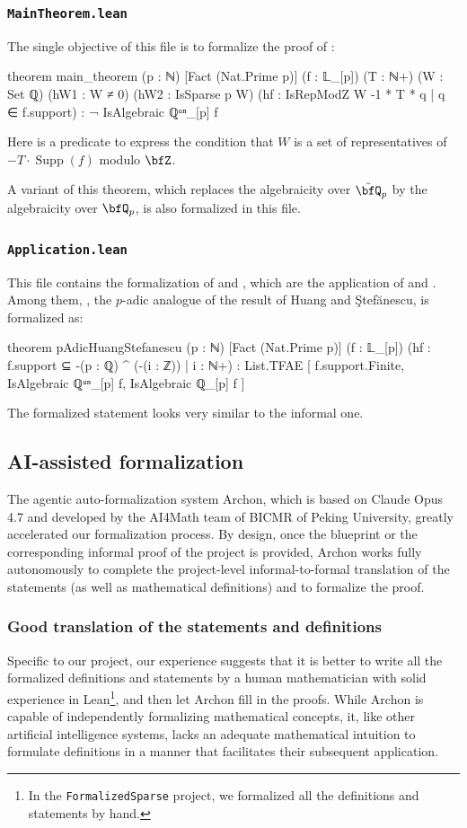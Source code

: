 \documentclass[english,oneside]{smfart}
\newcommand{\opn}[1]{\operatorname{#1}}
\begin{document}
\subsubsection{\texttt{MainTheorem.lean}}
The single objective of this file is to formalize the proof of :
\begin{leancode}
theorem main_theorem (p : ℕ) [Fact (Nat.Prime p)] (f : 𝕃_[p]) (T : ℕ+)
(W : Set ℚ) (hW1 : W ≠ {0}) (hW2 : IsSparse p W)
(hf : IsRepModZ W {-1 * T * q | q ∈ f.support}) :
  ¬ IsAlgebraic ℚᵘⁿ_[p] f
\end{leancode}
Here  is a predicate to express the condition that $W$ is a set of representatives of $-T\cdot\opn{Supp}(f)$ modulo $\bfZ$.

A variant of this theorem, which replaces the algebraicity over $\breve{\bfQ}_p$ by the algebraicity over $\bfQ_p$, is also formalized in this file.

\subsubsection{\texttt{Application.lean}}
This file contains the formalization of  and , which are the application of  and . Among them, , the $p$-adic analogue of the result of Huang and Ştefănescu, is formalized as:
\begin{leancode}
theorem pAdicHuangStefanescu (p : ℕ) [Fact (Nat.Prime p)] 
(f : 𝕃_[p]) (hf : f.support ⊆ {-(p : ℚ) ^ (-(i : ℤ)) | i : ℕ+}) :
List.TFAE [
  f.support.Finite,
  IsAlgebraic ℚᵘⁿ_[p] f,
  IsAlgebraic ℚ_[p] f
]
\end{leancode}
The formalized statement looks very similar to the informal one.

\subsection{AI-assisted formalization}
The agentic auto-formalization system Archon, which is based on Claude Opus 4.7 and developed by the AI4Math team of BICMR of Peking University, greatly accelerated our formalization process. By design, once the blueprint or the corresponding informal proof of the project is provided, Archon works fully autonomously to complete the project-level informal-to-formal translation of the statements (as well as mathematical definitions) and to formalize the proof.

\subsubsection{Good translation of the statements and definitions}
Specific to our project, our experience suggests that it is better to write all the formalized definitions and statements by a human mathematician with solid experience in Lean\footnote{In the \texttt{FormalizedSparse} project, we formalized all the definitions and statements by hand.}, and then let Archon fill in the proofs. While Archon is capable of independently formalizing mathematical concepts, it, like other artificial intelligence systems, lacks an adequate mathematical intuition to formulate definitions in a manner that facilitates their subsequent application.
\end{document}
